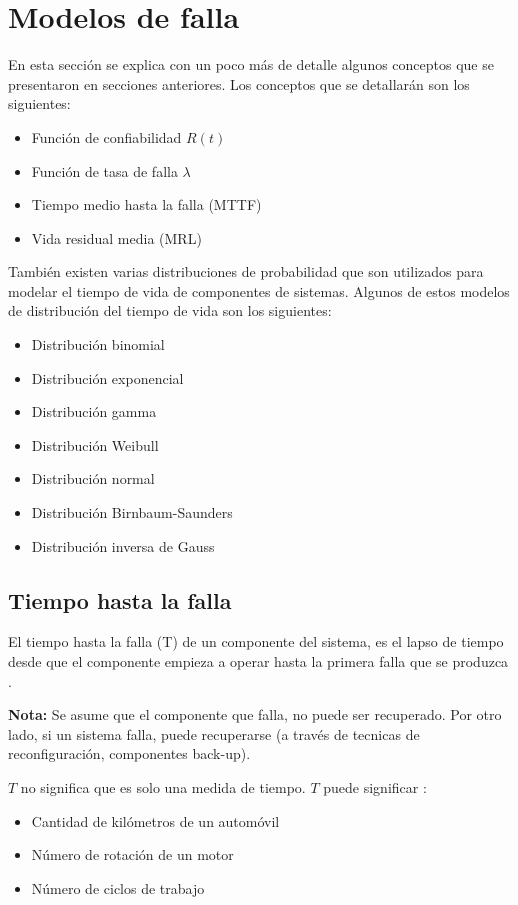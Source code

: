 \section{Modelos de falla}
En esta sección se explica con un poco más de detalle algunos conceptos que se presentaron en secciones anteriores. Los conceptos que se detallarán son los siguientes:

\begin{itemize}
  \item Función de confiabilidad $R(t)$
  \item Función de tasa de falla $\lambda$
  \item Tiempo medio hasta la falla (MTTF)
  \item Vida residual media (MRL)
\end{itemize}

También existen varias distribuciones de probabilidad que son utilizados para modelar el tiempo de vida de componentes de sistemas. Algunos de estos modelos de distribución del tiempo de vida son los siguientes:

\begin{itemize}
  \item Distribución binomial
  \item Distribución exponencial
  \item Distribución gamma
  \item Distribución Weibull
  \item Distribución normal
  \item Distribución Birnbaum-Saunders
  \item Distribución inversa de Gauss
\end{itemize}

\subsection{Tiempo hasta la falla}
El tiempo hasta la falla (T) de un componente del sistema, es el lapso de tiempo desde que el componente empieza a operar hasta la primera falla que se produzca \citep{Rausand04}.

\textbf{Nota: } Se asume que el componente que falla, no puede ser recuperado. Por otro lado, si un sistema falla, puede recuperarse (a través de tecnicas de reconfiguración, componentes back-up).

$T$ no significa que es solo una medida de tiempo. $T$ puede significar \citep{Rausand04}:
\begin{itemize}
  \item Cantidad de kilómetros de un automóvil
  \item Número de rotación de un motor
  \item Número de ciclos de trabajo
\end{itemize}


